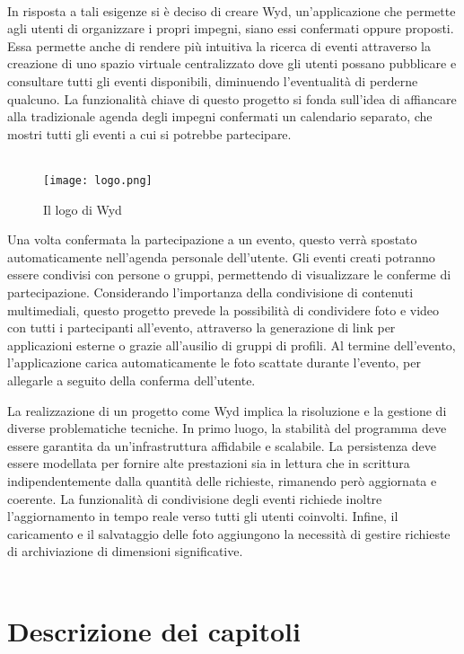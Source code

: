 \\
In risposta a tali esigenze si è deciso di creare Wyd, 
un'applicazione che permette agli utenti di organizzare i propri impegni, 
siano essi confermati oppure proposti. 
Essa permette anche di rendere più intuitiva la ricerca di eventi 
attraverso la creazione di uno spazio virtuale centralizzato 
dove gli utenti possano pubblicare e consultare tutti gli eventi disponibili,
diminuendo l’eventualità di perderne qualcuno.
La funzionalità chiave di questo progetto si fonda sull'idea di affiancare
alla tradizionale agenda degli impegni confermati un calendario separato, 
che mostri tutti gli eventi a cui si potrebbe partecipare. \\
\\
\begin{wrapfigure}{o}{0.4\textwidth}
    \centering
    \texttt{[image: logo.png]}
    \caption{Il logo di Wyd}
\end{wrapfigure}	
Una volta confermata la partecipazione a un evento, 
questo verrà spostato automaticamente nell'agenda personale dell'utente.
Gli eventi creati potranno essere condivisi con persone o gruppi, 
permettendo di visualizzare le conferme di partecipazione. 
Considerando l'importanza della condivisione di contenuti multimediali, 
questo progetto prevede la possibilità di condividere foto e video con tutti i partecipanti all'evento, 
attraverso la generazione di link per applicazioni esterne o grazie all'ausilio di gruppi di profili. 
Al termine dell'evento, l'applicazione carica automaticamente le foto scattate durante l'evento,
per allegarle a seguito della conferma dell'utente.



\clearpage
La realizzazione di un progetto come Wyd implica
la risoluzione e la gestione di diverse problematiche tecniche. 
In primo luogo, la stabilità del programma deve essere garantita 
da un'infrastruttura affidabile e scalabile. 
La persistenza deve essere modellata per fornire alte prestazioni sia in lettura che in scrittura 
indipendentemente dalla quantità delle richieste,
rimanendo però aggiornata e coerente.
La funzionalità di condivisione degli eventi richiede inoltre l'aggiornamento in tempo reale verso tutti gli utenti coinvolti.
Infine, il caricamento e il salvataggio delle foto aggiungono la necessità di gestire richieste di archiviazione di dimensioni significative.\\
\\
\section*{Descrizione dei capitoli}

